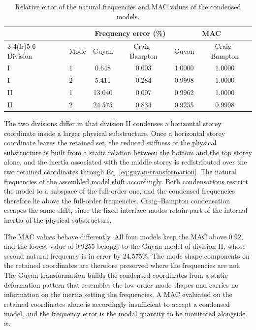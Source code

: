 \documentclass[a4paper,fleqn,review,12pt]{cas-sc}
\numberwithin{equation}{section}
\begin{document}
\begin{table}[htbp]
	\centering
	\caption{Relative error of the natural frequencies and MAC values of the condensed models.}
	\label{tab:modal}
	\begin{tabular}{llcccc}
		\toprule
		& & \multicolumn{2}{c}{Frequency error (\%)} & \multicolumn{2}{c}{MAC}\\
		\cmidrule(lr){3-4}\cmidrule(lr){5-6}
		Division & Mode & Guyan & Craig--Bampton & Guyan & Craig--Bampton\\
		\midrule
		I  & 1 & 0.648  & 0.003 & 1.0000 & 1.0000\\
		I  & 2 & 5.411  & 0.284 & 0.9998 & 1.0000\\
		\midrule
		II & 1 & 13.040 & 0.007 & 0.9962 & 1.0000\\
		II & 2 & 24.575 & 0.834 & 0.9255 & 0.9998\\
		\bottomrule
	\end{tabular}
\end{table}

The two divisions differ in that division II condenses a horizontal storey coordinate inside a larger physical substructure. Once a horizontal storey coordinate leaves the retained set, the reduced stiffness of the physical substructure is built from a static relation between the bottom and the top storey alone, and the inertia associated with the middle storey is redistributed over the two retained coordinates through Eq. \eqref{eq:guyan-transformation}. The natural frequencies of the assembled model shift accordingly. Both condensations restrict the model to a subspace of the full-order one, and the condensed frequencies therefore lie above the full-order frequencies. Craig--Bampton condensation escapes the same shift, since the fixed-interface modes retain part of the internal inertia of the physical substructure.

The MAC values behave differently. All four models keep the MAC above 0.92, and the lowest value of 0.9255 belongs to the Guyan model of division II, whose second natural frequency is in error by 24.575\%. The mode shape components on the retained coordinates are therefore preserved where the frequencies are not. The Guyan transformation builds the condensed coordinates from a static deformation pattern that resembles the low-order mode shapes and carries no information on the inertia setting the frequencies. A MAC evaluated on the retained coordinates alone is accordingly insufficient to accept a condensed model, and the frequency error is the modal quantity to be monitored alongside it.
\end{document}
